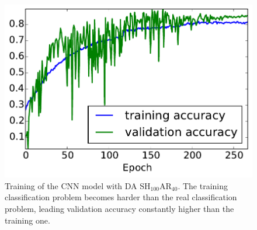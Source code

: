\begin{figure}[h]
\centering
\includegraphics[width=.5\textwidth]{../Figures/CHES2017/acc_DAadd_remove100_shift_40_deep_good_for_CW_shift_wo_DO.pdf} 
\caption{Training of the CNN model with DA $\mathrm{SH}_{100}\mathrm{AR}_{40}$. The training classification problem becomes harder than the real classification problem, leading validation accuracy constantly higher than the training one.}\label{fig:high_acc}
\end{figure}


